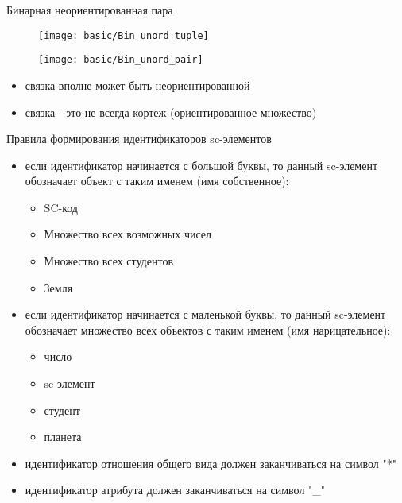 \begin{frame}{Бинарная неориентированная пара}
  \begin{center}
    \begin{figure}
      \texttt{[image: basic/Bin\_unord\_tuple]}
    \end{figure}

    \objeqv

    \begin{figure}
      \texttt{[image: basic/Bin\_unord\_pair]}
    \end{figure}
  \end{center}

  \begin{itemize}
  \item связка вполне может быть неориентированной
  \item связка - это не всегда кортеж (ориентированное множество)
  \end{itemize}
\end{frame}

\begin{frame}[shrink=5]{Правила формирования идентификаторов sc-элементов}
  \begin{itemize}
  \item если идентификатор начинается с большой буквы, то данный
    sc-элемент обозначает объект с таким именем (имя собственное):
    \begin{itemize}
    \item SC-код
    \item Множество всех возможных чисел
    \item Множество всех студентов
    \item Земля
    \end{itemize}
  \item если идентификатор начинается с маленькой буквы, то данный
    sc-элемент обозначает множество всех объектов с таким именем (имя
    нарицательное):
    \begin{itemize}
    \item число
    \item sc-элемент
    \item студент
    \item планета
    \end{itemize}
  \item идентификатор отношения общего вида должен заканчиваться на символ "*"
  \item идентификатор атрибута должен заканчиваться на символ "\_"
  \end{itemize}
\end{frame}

